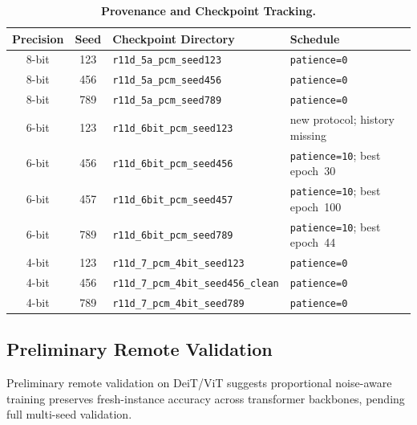 \begin{table}[htbp]
\centering
\caption{\textbf{Provenance and Checkpoint Tracking.}}
\label{tab:supp_provenance}
\scriptsize
\setlength{\tabcolsep}{3pt}
\begin{tabular}{@{}ccp{}p{}@{}}
\toprule
\textbf{Precision} & \textbf{Seed} & \textbf{Checkpoint Directory} & \textbf{Schedule} \\
\midrule
8-bit & 123 & \texttt{r11d\_5a\_pcm\_seed123} & \texttt{patience=0} \\
8-bit & 456 & \texttt{r11d\_5a\_pcm\_seed456} & \texttt{patience=0} \\
8-bit & 789 & \texttt{r11d\_5a\_pcm\_seed789} & \texttt{patience=0} \\
6-bit & 123 & \texttt{r11d\_6bit\_pcm\_seed123} & new protocol; history missing \\
6-bit & 456 & \texttt{r11d\_6bit\_pcm\_seed456} & \texttt{patience=10}; best epoch~30 \\
6-bit & 457 & \texttt{r11d\_6bit\_pcm\_seed457} & \texttt{patience=10}; best epoch~100 \\
6-bit & 789 & \texttt{r11d\_6bit\_pcm\_seed789} & \texttt{patience=10}; best epoch~44 \\
4-bit & 123 & \texttt{r11d\_7\_pcm\_4bit\_seed123} & \texttt{patience=0} \\
4-bit & 456 & \texttt{r11d\_7\_pcm\_4bit\_seed456\_clean} & \texttt{patience=0} \\
4-bit & 789 & \texttt{r11d\_7\_pcm\_4bit\_seed789} & \texttt{patience=0} \\
\bottomrule
\end{tabular}
\end{table}

\subsection{Preliminary Remote Validation}
\label{subsec:supp-remote-validation}

Preliminary remote validation on DeiT/ViT suggests proportional noise-aware training preserves fresh-instance accuracy across transformer backbones, pending full multi-seed validation.

